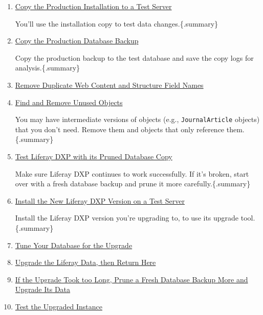 \begin{enumerate}
  \begin{enumerate}
  \def\labelenumii{\arabic{enumii}.}
  \item
    \href{/docs/7-2/deploy/-/knowledge_base/d/test-upgrading-a-product-backup-copy\#copy-the-production-installation-to-a-test-server}{Copy
    the Production Installation to a Test Server}

    You'll use the installation copy to test data changes.\{.summary\}
  \item
    \href{/docs/7-2/deploy/-/knowledge_base/d/test-upgrading-a-product-backup-copy\#copy-the-production-backup-to-the-test-database}{Copy
    the Production Database Backup}

    Copy the production backup to the test database and save the copy
    logs for analysis.\{.summary\}
  \item
    \href{/docs/7-2/deploy/-/knowledge_base/d/pruning-the-database}{Remove
    Duplicate Web Content and Structure Field Names}
  \item
    \href{/docs/7-2/deploy/-/knowledge_base/d/pruning-the-database}{Find
    and Remove Unused Objects}

    You may have intermediate versions of objects (e.g.,
    \texttt{JournalArticle} objects) that you don't need. Remove them
    and objects that only reference them.\{.summary\}
  \item
    \href{/docs/7-2/deploy/-/knowledge_base/d/pruning-the-database\#test-with-the-pruned-database-copy}{Test
    Liferay DXP with its Pruned Database Copy}

    Make sure Liferay DXP continues to work successfully. If it's
    broken, start over with a fresh database backup and prune it more
    carefully.\{.summary\}
  \item
    \href{/docs/7-2/deploy/-/knowledge_base/d/upgrading-your-test-server-and-database}{Install
    the New Liferay DXP Version on a Test Server}

    Install the Liferay DXP version you're upgrading to, to use its
    upgrade tool.\{.summary\}
  \item
    \href{/docs/7-2/deploy/-/knowledge_base/d/tuning-for-the-data-upgrade}{Tune
    Your Database for the Upgrade}
  \item
    \href{/docs/7-2/deploy/-/knowledge_base/d/upgrading-the-product-data}{Upgrade
    the Liferay Data, then Return Here}
  \item
    \href{/docs/7-2/deploy/-/knowledge_base/d/test-upgrading-a-product-backup-copy\#copy-the-production-backup-to-the-test-database}{If
    the Upgrade Took too Long, Prune a Fresh Database Backup More and
    Upgrade Its Data}
  \item
    \href{/docs/7-2/deploy/-/knowledge_base/d/pruning-the-database}{Test
    the Upgraded Instance}


\end{enumerate}
\end{enumerate}
